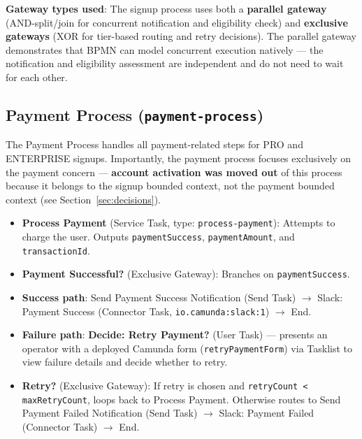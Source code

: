 \documentclass[10pt,a4paper]{article}
\begin{document}
\textbf{Gateway types used}: The signup process uses both a \textbf{parallel gateway} (AND-split/join for concurrent notification and eligibility check) and \textbf{exclusive gateways} (XOR for tier-based routing and retry decisions). The parallel gateway demonstrates that BPMN can model concurrent execution natively --- the notification and eligibility assessment are independent and do not need to wait for each other.


\subsection{Payment Process (\texttt{payment-process})}

The Payment Process handles all payment-related steps for PRO and ENTERPRISE signups. Importantly, the payment process focuses exclusively on the payment concern --- \textbf{account activation was moved out} of this process because it belongs to the signup bounded context, not the payment bounded context (see Section~\ref{sec:decisions}).

\begin{itemize}
    \item \textbf{Process Payment} (Service Task, type: \texttt{process-payment}): Attempts to charge the user. Outputs \texttt{paymentSuccess}, \texttt{paymentAmount}, and \texttt{transactionId}.
    \item \textbf{Payment Successful?} (Exclusive Gateway): Branches on \texttt{paymentSuccess}.
    \item \textbf{Success path}: Send Payment Success Notification (Send Task) $\rightarrow$ Slack: Payment Success (Connector Task, \texttt{io.camunda:slack:1}) $\rightarrow$ End.
    \item \textbf{Failure path}: \textbf{Decide: Retry Payment?} (User Task) --- presents an operator with a deployed Camunda form (\texttt{retryPaymentForm}) via Tasklist to view failure details and decide whether to retry.
    \item \textbf{Retry?} (Exclusive Gateway): If retry is chosen and \texttt{retryCount < maxRetryCount}, loops back to Process Payment. Otherwise routes to Send Payment Failed Notification (Send Task) $\rightarrow$ Slack: Payment Failed (Connector Task) $\rightarrow$ End.
\end{itemize}
\end{document}
